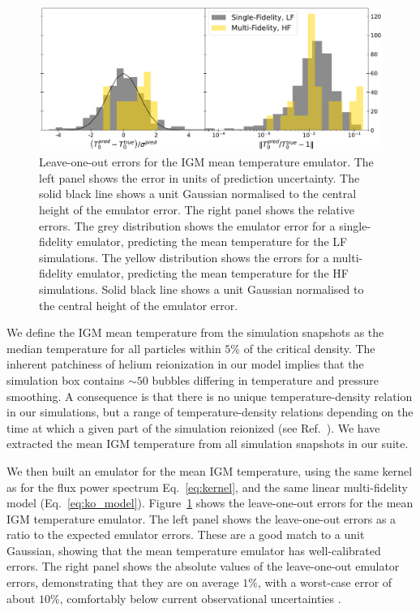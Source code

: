 \documentclass[a4paper,11pt]{article}
\begin{document}
\begin{figure}
    \centering
    \includegraphics[width=\textwidth]{figures/t0emu_errors.pdf}
    \caption{\label{fig:t0_error}
    Leave-one-out errors for the IGM mean temperature emulator.
    The left panel shows the error in units of prediction uncertainty. The solid black line shows a unit Gaussian normalised to the central height of the emulator error. The right panel shows the relative errors.
    The grey distribution shows the emulator error for a single-fidelity emulator, predicting the mean temperature for the LF simulations.
    The yellow distribution shows the errors for a multi-fidelity emulator, predicting the mean temperature for the HF simulations. Solid black line shows a unit Gaussian normalised to the central height of the emulator error.
    }
\end{figure}

We define the IGM mean temperature from the simulation snapshots as the median temperature for all particles within $5\%$ of the critical density.
The inherent patchiness of helium reionization in our model implies that the simulation box contains $\sim 50$ bubbles differing in temperature and pressure smoothing. A consequence is that there is no unique temperature-density relation in our simulations, but a range of temperature-density relations depending on the time at which a given part of the simulation reionized (see Ref.~\cite{UptonSanderbeck:2020}). We have extracted the mean IGM temperature from all simulation snapshots in our suite.

We then built an emulator for the mean IGM temperature, using the same kernel as for the flux power spectrum Eq.~\ref{eq:kernel}, and the same linear multi-fidelity model (Eq.~\ref{eq:ko_model}). Figure~\ref{fig:t0_error} shows the leave-one-out errors for the mean IGM temperature emulator. The left panel shows the leave-one-out errors as a ratio to the expected emulator errors. These are a good match to a unit Gaussian, showing that the mean temperature emulator has well-calibrated errors. The right panel shows the absolute values of the leave-one-out emulator errors, demonstrating that they are on average $1\%$, with a worst-case error of about $10\%$, comfortably below current observational uncertainties \cite{Gaikwad:2020}.
\end{document}
